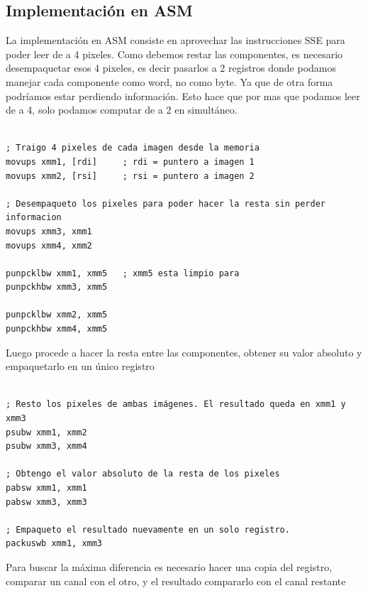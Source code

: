 \documentclass[10pt,a4paper,spanish]{article}
\begin{document}
\subsection{Implementación en ASM}

La implementación en ASM consiste en aprovechar las instrucciones SSE para poder leer de a 4 pixeles. Como debemos restar las componentes, es necesario desempaquetar esos 4 pixeles, es decir pasarlos a 2 registros donde podamos manejar cada componente como word, no como byte. Ya que de otra forma podríamos estar perdiendo información. Esto hace que por mas que podamos leer de a 4, solo podamos computar de a 2 en simultáneo.

\begin{codesnippet}
\begin{verbatim}

; Traigo 4 pixeles de cada imagen desde la memoria
movups xmm1, [rdi]     ; rdi = puntero a imagen 1
movups xmm2, [rsi]     ; rsi = puntero a imagen 2

; Desempaqueto los pixeles para poder hacer la resta sin perder informacion
movups xmm3, xmm1
movups xmm4, xmm2

punpcklbw xmm1, xmm5   ; xmm5 esta limpio para 
punpckhbw xmm3, xmm5

punpcklbw xmm2, xmm5
punpckhbw xmm4, xmm5

\end{verbatim}
\end{codesnippet}

Luego procede a hacer la resta entre las componentes, obtener su valor absoluto y empaquetarlo en un único registro

\begin{codesnippet}
\begin{verbatim}

; Resto los pixeles de ambas imágenes. El resultado queda en xmm1 y xmm3
psubw xmm1, xmm2
psubw xmm3, xmm4

; Obtengo el valor absoluto de la resta de los pixeles
pabsw xmm1, xmm1
pabsw xmm3, xmm3

; Empaqueto el resultado nuevamente en un solo registro.
packuswb xmm1, xmm3

\end{verbatim}
\end{codesnippet}

Para buscar la máxima diferencia es necesario hacer una copia del registro, comparar un canal con el otro, y el resultado compararlo con el canal restante
\end{document}
